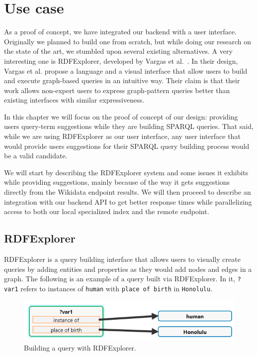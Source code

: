 \chapter{Use case}
\label{chap:Frontend}

As a proof of concept, we have integrated our backend with a user interface. 
Originally we planned to build one from scratch, but while doing our research on the state of the art, we stumbled upon several existing alternatives. 
A very interesting one is RDFExplorer, developed by Vargas et al.~\cite{Vargas2019}. 
In their design, Vargas et al. propose a language and a visual interface that allow users to build and execute graph-based queries in an intuitive way. 
Their claim is that their work allows non-expert users to express graph-pattern queries better than existing interfaces with similar expressiveness. 

In this chapter we will focus on the proof of concept of our design: 
providing users query-term suggestions while they are building SPARQL queries. 
That said, while we are using RDFExplorer as our user interface, any user interface that would provide users suggestions for their SPARQL query building process would be a valid candidate.

We will start by describing the RDFExplorer system and some issues it exhibits while providing suggestions, mainly because of the way it gets suggestions directly from the Wikidata endpoint results. 
We will then proceed to describe an integration with our backend API to get better response times while parallelizing access to both our local specialized index and the remote endpoint.

\section{RDFExplorer}

RDFExplorer is a query building interface that allows users to visually create queries by adding entities and properties as they would add nodes and edges in a graph. The following is an example of a query built via RDFExplorer. In it, \texttt{?var1} refers to instances of \texttt{human} with \texttt{place of birth} in \texttt{Honolulu}.

\begin{figure}[h]
    \centering
        \includegraphics[width=.8\linewidth]{imagenes/rdfExplorer1.png}
        \caption{Building a query with RDFExplorer.}
        \label{fig:rdfExplorer1}
\end{figure}

